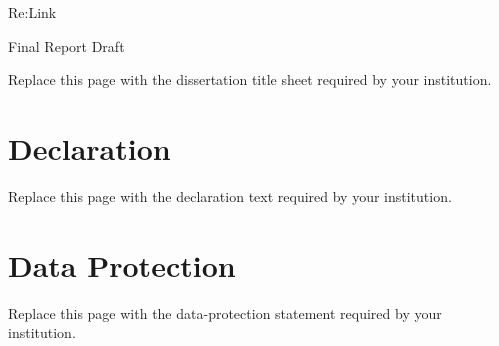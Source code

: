 \documentclass[12pt,a4paper]{article}
\begin{document}
\begin{titlepage}
\centering
\vspace*{3cm}
{\Huge Re:Link\par}
\vspace{0.75cm}
{\Large Final Report Draft\par}
\vfill
{\large Replace this page with the dissertation title sheet required by your institution.\par}
\end{titlepage}
\clearpage

\section*{Declaration}
Replace this page with the declaration text required by your institution.
\clearpage

\section*{Data Protection}
Replace this page with the data-protection statement required by your institution.
\clearpage

\begin{abstract}
Commercial remote-access platforms rely on vendor-controlled infrastructure that can introduce operational and privacy risks. This report investigates whether a custom solution with self-hosting capabilities can preserve practical peer-to-peer functionality while minimising retained metadata. It presents Re:Link, a prototype remote access system designed around privacy-by-design principles and a blind rendezvous protocol. The system combines a Rust signalling server, Redis configured for ephemeral coordination state, and a Windows desktop client built with Flutter and Rust. Session bootstrap uses a deep link for invitations that contains a locally generated secret. After successful negotiation, the connection flows via direct peer-to-peer channels. The evaluation is qualitative and examines current system behaviour and compares it with properties of RustDesk, OnionShare, and Magic Wormhole. The resulting prototype can start peer sessions via a coordination service without persistent identifiers, while limiting the server’s visibility into signalling content. However, Re:Link does not provide anonymity, and it is not a production-ready product. It remains constrained by external secret sharing and connectivity limitations in restrictive network environments. Nevertheless, the report demonstrates that privacy-preserving, self-hosted remote access is a viable architectural direction and provides a proof-of-concept for a lower-retention alternative to conventional remote-access systems.
\end{abstract}
\pagebreak
\end{document}
